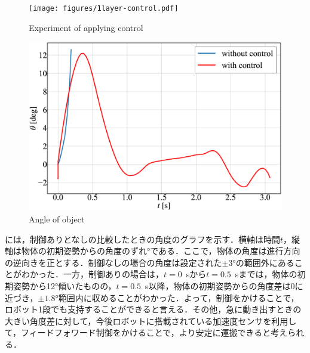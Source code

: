 \begin{figure}[tb]
  \centering
  \texttt{[image: figures/1layer-control.pdf]}
  \caption{Experiment of applying control}
  \label{fig:control}
\end{figure}
\begin{figure}[tb]
  \centering
  \includegraphics[width=0.8\columnwidth]{figures/angle-control.eps}
  \caption{Angle of object}
  \label{fig:angle}
\end{figure}
には，制御ありとなしの比較したときの角度のグラフを示す．横軸は時間$t$，縦軸は物体の初期姿勢からの角度のずれ\si{\degree}である．ここで，物体の角度は進行方向の逆向きを正とする．制御なしの場合の角度は設定された$\pm3$\si{\degree}の範囲外にあることがわかった．一方，制御ありの場合は，$t=0$~sから$t=0.5$~sまでは，物体の初期姿勢から12\si{\degree}傾いたものの，$t=0.5$~s以降，物体の初期姿勢からの角度差は0に近づき，$\pm1.8$\si{\degree}範囲内に収めることがわかった．よって，制御をかけることで，ロボット1段でも支持することができると言える．その他，急に動き出すときの大きい角度差に対して，今後ロボットに搭載されている加速度センサを利用して，フィードフォワード制御をかけることで，より安定に運搬できると考えられる．